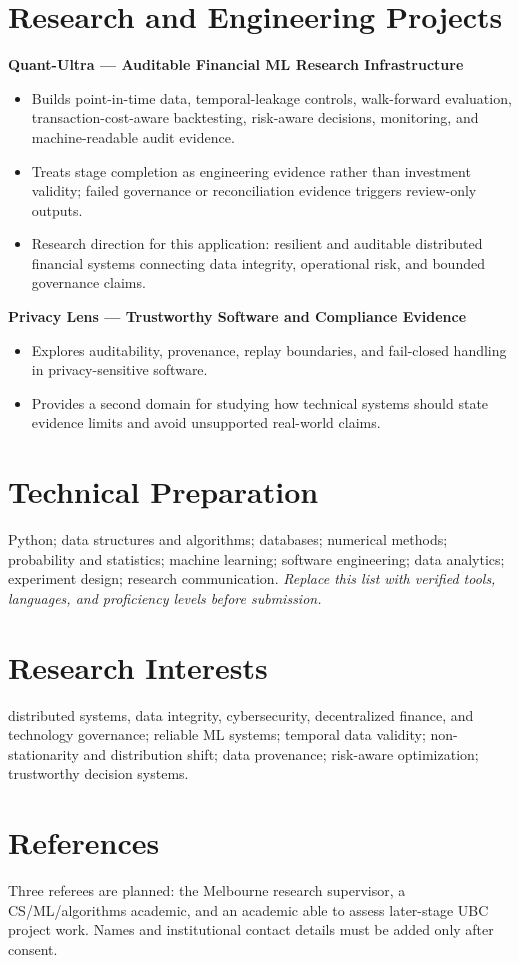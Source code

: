 \documentclass[11pt]{article}
\begin{document}
\section*{Research and Engineering Projects}
\textbf{Quant-Ultra --- Auditable Financial ML Research Infrastructure}
\begin{itemize}
\item Builds point-in-time data, temporal-leakage controls, walk-forward evaluation, transaction-cost-aware backtesting, risk-aware decisions, monitoring, and machine-readable audit evidence.
\item Treats stage completion as engineering evidence rather than investment validity; failed governance or reconciliation evidence triggers review-only outputs.
\item Research direction for this application: resilient and auditable distributed financial systems connecting data integrity, operational risk, and bounded governance claims.
\end{itemize}

\begin{samepage}
\textbf{Privacy Lens --- Trustworthy Software and Compliance Evidence}
\begin{itemize}
\item Explores auditability, provenance, replay boundaries, and fail-closed handling in privacy-sensitive software.
\item Provides a second domain for studying how technical systems should state evidence limits and avoid unsupported real-world claims.
\end{itemize}
\end{samepage}

\section*{Technical Preparation}
Python; data structures and algorithms; databases; numerical methods; probability and statistics; machine learning; software engineering; data analytics; experiment design; research communication. \textit{Replace this list with verified tools, languages, and proficiency levels before submission.}

\section*{Research Interests}
distributed systems, data integrity, cybersecurity, decentralized finance, and technology governance; reliable ML systems; temporal data validity; non-stationarity and distribution shift; data provenance; risk-aware optimization; trustworthy decision systems.

\section*{References}
Three referees are planned: the Melbourne research supervisor, a CS/ML/algorithms academic, and an academic able to assess later-stage UBC project work. Names and institutional contact details must be added only after consent.
\end{document}
